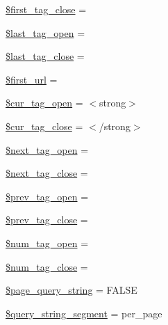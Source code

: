 \begin{DoxyCompactItemize}
\item 
\hyperlink{class_c_i___pagination_a1aa5f33d3f661838fa1f8482128a19c7}{\$first\+\_\+tag\+\_\+close} = \textquotesingle{}\textquotesingle{}
\item 
\hyperlink{class_c_i___pagination_ac7e807e8227dd4528c2b315424d126db}{\$last\+\_\+tag\+\_\+open} = \textquotesingle{}\textquotesingle{}
\item 
\hyperlink{class_c_i___pagination_a8e024740710598d97da42739bd231dda}{\$last\+\_\+tag\+\_\+close} = \textquotesingle{}\textquotesingle{}
\item 
\hyperlink{class_c_i___pagination_ac7fe85e2fda76364772be52656e346b8}{\$first\+\_\+url} = \textquotesingle{}\textquotesingle{}
\item 
\hyperlink{class_c_i___pagination_a60f0f6e2515e166fa11657186b39345d}{\$cur\+\_\+tag\+\_\+open} = \textquotesingle{}$<$strong$>$\textquotesingle{}
\item 
\hyperlink{class_c_i___pagination_a8f284fc318c9b1a0d20e5aa53cdbb540}{\$cur\+\_\+tag\+\_\+close} = \textquotesingle{}$<$/strong$>$\textquotesingle{}
\item 
\hyperlink{class_c_i___pagination_a0345e4646ae630d4d95f98de048e4572}{\$next\+\_\+tag\+\_\+open} = \textquotesingle{}\textquotesingle{}
\item 
\hyperlink{class_c_i___pagination_aa3dc112ae0edd3eb76d13eb3f5a57d02}{\$next\+\_\+tag\+\_\+close} = \textquotesingle{}\textquotesingle{}
\item 
\hyperlink{class_c_i___pagination_ab8f96d2bdfd51057db368d8ffd57ca5c}{\$prev\+\_\+tag\+\_\+open} = \textquotesingle{}\textquotesingle{}
\item 
\hyperlink{class_c_i___pagination_abb46001ebebf96f2562ea1f8ced80aa1}{\$prev\+\_\+tag\+\_\+close} = \textquotesingle{}\textquotesingle{}
\item 
\hyperlink{class_c_i___pagination_a1227a094532251dca78e533d9b9f068f}{\$num\+\_\+tag\+\_\+open} = \textquotesingle{}\textquotesingle{}
\item 
\hyperlink{class_c_i___pagination_ab84030017256e7345316413cfefd41a5}{\$num\+\_\+tag\+\_\+close} = \textquotesingle{}\textquotesingle{}
\item 
\hyperlink{class_c_i___pagination_a2721bf5c6a50b356b53f1c1bdb9d139e}{\$page\+\_\+query\+\_\+string} = F\+A\+L\+S\+E
\item 
\hyperlink{class_c_i___pagination_a8fe6ddd39110b4952ddcca9bba07c019}{\$query\+\_\+string\+\_\+segment} = \textquotesingle{}per\+\_\+page\textquotesingle{}
\item 

\end{DoxyCompactItemize}
